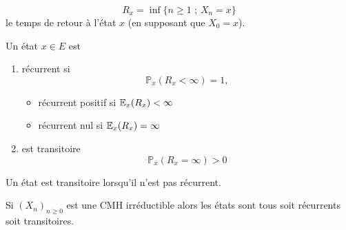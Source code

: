 $$
R_x=\inf\{n\geq 1\text{ ; }X_n=x\}
$$ 
le temps de retour à l'état $x$ (en supposant que $X_0=x$).
\begin{definition}
Un état $x\in E$ est
\begin{enumerate}
\item récurrent si
$$
\mathbb{P}_x(R_x<\infty)=1,
$$ 
\begin{itemize}
    \item récurrent positif si $\mathbb{E}_x(R_x) <\infty$
    \item récurrent nul si $\mathbb{E}_x(R_x) =\infty$
\end{itemize}
\item est transitoire
$$
\mathbb{P}_x(R_x=\infty)>0
$$
\end{enumerate}
Un état est transitoire lorsqu'il n'est pas récurrent.
\end{definition}
Si $(X_n)_{n\geq 0}$ est une CMH irréductible alors les états sont tous soit récurrents soit transitoires.

